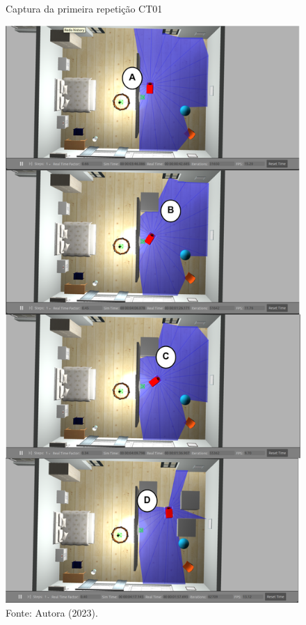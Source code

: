 \begin{figure}[H]
    \centering
    \caption{Captura da primeira repetição CT01}
    \includegraphics[scale=0.35]{ct01_1.png}
    \caption*{Fonte: Autora (2023).}
    \label{fig:ct01_1}
\end{figure}



